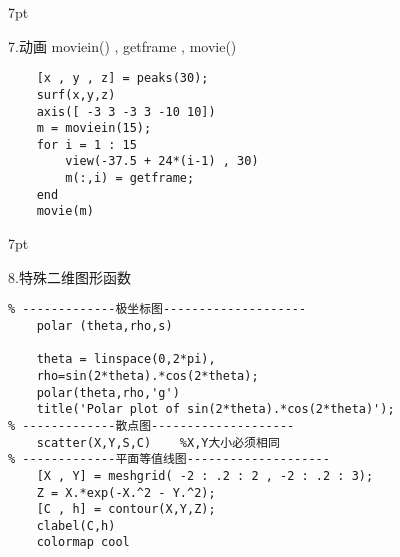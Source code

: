 \documentclass{article} %
\newenvironment{eg}{%
\def\FrameCommand{%
\hspace{1pt}%
{\color{Gray}\vrule width 2pt}%
{\color{egshade}\vrule width 4pt}%
\colorbox{egshade}%
}%
\MakeFramed{\advance\hsize-\width\FrameRestore}%
\noindent\hspace{-4.55pt}%
\begin{adjustwidth}{}{7pt}%
\vspace{2pt}\vspace{2pt}%
\normalfont %
}
{%
\vspace{2pt}\end{adjustwidth}\endMakeFramed%
}
\begin{document}
\begin{eg}
    7.动画 moviein() , getframe , movie() 
\end{eg}
\begin{lstlisting}
    [x , y , z] = peaks(30);         
    surf(x,y,z) 
    axis([ -3 3 -3 3 -10 10]) 
    m = moviein(15); 
    for i = 1 : 15 
        view(-37.5 + 24*(i-1) , 30) 
        m(:,i) = getframe; 
    end 
    movie(m)
\end{lstlisting}

\begin{eg}
    8.特殊二维图形函数
\end{eg}
\begin{lstlisting}
% -------------极坐标图--------------------
    polar (theta,rho,s) 

    theta = linspace(0,2*pi),                         
    rho=sin(2*theta).*cos(2*theta); 
    polar(theta,rho,'g') 
    title('Polar plot of sin(2*theta).*cos(2*theta)');
% -------------散点图--------------------
    scatter(X,Y,S,C)    %X,Y大小必须相同
% -------------平面等值线图--------------------
    [X , Y] = meshgrid( -2 : .2 : 2 , -2 : .2 : 3); 
    Z = X.*exp(-X.^2 - Y.^2); 
    [C , h] = contour(X,Y,Z); 
    clabel(C,h) 
    colormap cool 
\end{lstlisting}
\end{document}
